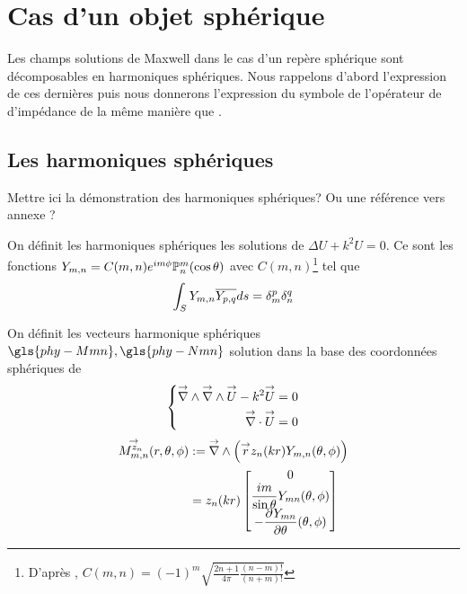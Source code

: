 \section{Cas d'un objet sphérique}

    Les champs solutions de Maxwell dans le cas d'un repère sphérique sont décomposables en harmoniques sphériques. Nous rappelons d'abord l’expression de ces dernières puis nous donnerons l'expression du symbole de l'opérateur de d'impédance de la même manière que \cite{cheng_spectral_1993}.

    \subsection{Les harmoniques sphériques}

        \begin{TODO}
          Mettre ici la démonstration des harmoniques sphériques? Ou une référence vers annexe ?
        \end{TODO}

        On définit les harmoniques sphériques les solutions de \(\Delta U + k^2 U = 0 \). Ce sont les fonctions \(Y_{m,n} = C(m,n) e^{im\phi}\mathbb{P}^m_n(\cos \theta) \) avec \(C(m,n)\)\footnote{D’après \cite[p.~24]{nedelec_acoustic_2001}, \( C(m,n) = (-1)^m\sqrt{\frac{2n+1}{4\pi}\frac{(n-m)!}{(n+m)!}}\)} tel que
        \[
         \displaystyle\int_S Y_{m,n} {\overline{Y_{p,q}}} ds = \delta_m^p \delta_n^q
        \]


        On définit les vecteurs harmonique sphériques\(\gls{phy-Mmn} ,\gls{phy-Nmn}\) solution dans la base des coordonnées sphériques de 
        \[
            \left\lbrace
                \begin{aligned}
                    {\overset{\rightarrow}{\nabla}}\wedge {\overset{\rightarrow}{\nabla}}\wedge {\overset{\rightarrow}{U}} - k^2 {\overset{\rightarrow}{U}} = 0\\
                    {\overset{\rightarrow}{\nabla}}\cdot {\overset{\rightarrow}{U}} = 0
                \end{aligned}
            \right.
        \]
        \begin{align}
            \label{eq:defMmn}
            \Mmn[z_n](\rtp) &:= \vrot \left( \vect{r} z_n(kr) Y_{m,n}(\tp) \right)\\
            &= z_n(kr)
            \begin{bmatrix}
                0 
                \\
                \frac{im}{\sin\theta}Y_{mn}(\tp)
                \\
                - \ddr{\theta}{Y_{mn}}(\tp)
            \end{bmatrix}
        \end{align}

